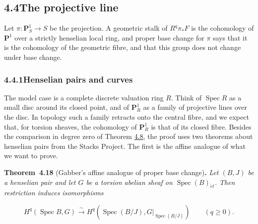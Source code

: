 \documentclass[11pt]{article}
\newenvironment{bpstatement}[2]{\par\addvspace{0.6\baselineskip}\noindent\textbf{#1}#2\textbf{.}\enspace\ignorespaces}
  {\par\addvspace{0.4\baselineskip}}
\newenvironment{bpstatementit}[2]{\begin{bpstatement}{#1}{#2}\itshape\ignorespaces}{\end{bpstatement}}
\begin{document}
\subsection*{\texorpdfstring{4.4\quad The projective line}{4.4 The projective line}}
\label{bp331}%
\label{bp332}%
Let \(\pi:\mathbf P^1_S\to S\) be the projection. A geometric stalk of \(R^q\pi_*F\) is the cohomology of \(\mathbf P^1\) over a strictly henselian local ring, and proper base change for \(\pi\) says that it is the cohomology of the geometric fibre, and that this group does not change under base change.

\subsubsection*{\texorpdfstring{4.4.1\quad Henselian pairs and curves}{4.4.1 Henselian pairs and curves}}
\label{bp333}%
\label{bp334}%
The model case is a complete discrete valuation ring \(R\). Think of \(\operatorname{Spec}R\) as a small disc around its closed point, and of \(\mathbf P^1_R\) as a family of projective lines over the disc. In topology such a family retracts onto the central fibre, and we expect that, for torsion sheaves, the cohomology of \(\mathbf P^1_R\) is that of its closed fibre. Besides the comparison in degree zero of Theorem \hyperref[bp308]{4.8}, the proof uses two theorems about henselian pairs from the Stacks Project. The first is the affine analogue of what we want to prove.

\label{bp335}%
\begin{bpstatementit}{Theorem~4.18}{ (Gabber's affine analogue of proper base change)}
Let \((B,J)\) be a henselian pair and let \(G\) be a torsion abelian sheaf on \(\operatorname{Spec}(B)_{\acute{e}t}\). Then restriction induces isomorphisms

\[
H^q(\operatorname{Spec}B,G)
\xrightarrow{\sim}
H^q(\operatorname{Spec}(B/J),G|_{\operatorname{Spec}(B/J)})
\qquad(q\geq0).
\]
\end{bpstatementit}
\end{document}
